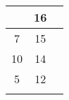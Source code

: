 \begin{table}[H]
\begin{tabularx}{\textwidth}{p{.1em}cc}
\begin{tabular}[t]{cc}
\multicolumn{1}{|c|}{12}                                                        & \multicolumn{1}{c|}{16}                                                             \\ \hline
\multicolumn{1}{|c|}{7}                                                        & \multicolumn{1}{c|}{15}                                                             \\ \hline
\multicolumn{1}{|c|}{10}                                                        & \multicolumn{1}{c|}{14}                                                             \\ \hline
\multicolumn{1}{|c|}{5}                                                        & \multicolumn{1}{c|}{12}                                                             \\ \hline
\end{tabular}

\end{tabularx}\end{table}